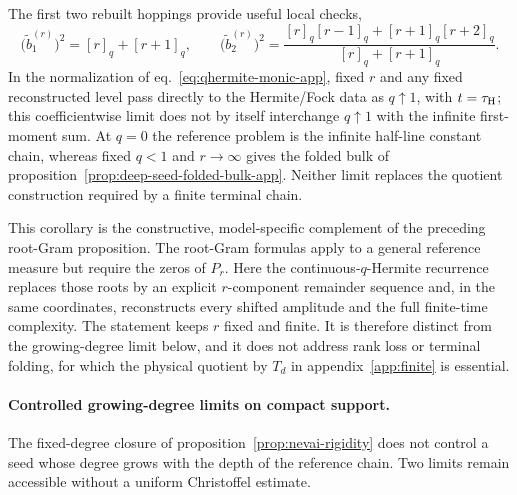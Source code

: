 \documentclass[a4paper,11pt]{article}
\theoremstyle{definition}
\theoremstyle{remark}
\begin{document}
The first two rebuilt hoppings provide useful local checks,
\begin{equation}
   \bigl(\widetilde b_1^{(r)}\bigr)^2=[r]_q+[r+1]_q,
   \qquad
   \bigl(\widetilde b_2^{(r)}\bigr)^2=
   \frac{[r]_q[r-1]_q+[r+1]_q[r+2]_q}
        {[r]_q+[r+1]_q}.
   \label{eq:qhermite-first-hoppings-app}
\end{equation}
In the normalization of eq.~\eqref{eq:qhermite-monic-app}, fixed $r$
and any fixed reconstructed level pass directly to the Hermite/Fock
data as $q\uparrow1$, with $t=\tau_{\rm H}$; this coefficientwise limit
does not by itself interchange $q\uparrow1$ with the infinite
first-moment sum.  At $q=0$ the reference problem is the infinite
half-line constant chain, whereas fixed $q<1$ and $r\to\infty$ gives
the folded bulk of proposition~\ref{prop:deep-seed-folded-bulk-app}.
Neither limit replaces the quotient construction required by a
finite terminal chain.

This corollary is the constructive, model-specific complement of the preceding root-Gram
proposition.  The root-Gram formulas apply to a general reference measure but require the zeros of
$P_r$.  Here the continuous-$q$-Hermite recurrence replaces those roots by an explicit $r$-component
remainder sequence and, in the same coordinates, reconstructs every shifted amplitude and the full
finite-time complexity.  The statement keeps $r$ fixed and finite.  It is therefore distinct from
the growing-degree limit below, and it does not address rank loss or terminal folding, for which the
physical quotient by $T_d$ in appendix~\ref{app:finite} is essential.

\paragraph{Controlled growing-degree limits on compact support.}
\label{app:controlled-growing-degree}
The fixed-degree closure of proposition~\ref{prop:nevai-rigidity} does not control a seed whose
degree grows with the depth of the reference chain.  Two limits remain accessible without a
uniform Christoffel estimate.
\end{document}
